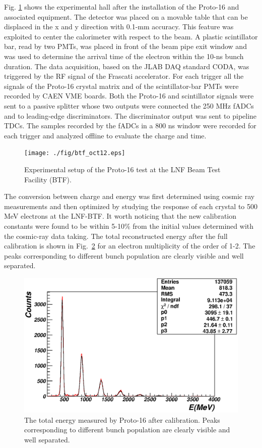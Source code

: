 Fig. \ref{fig:btf} shows the experimental hall after the installation
of the Proto-16 and associated equipment. The detector was placed on a
movable table that can be displaced in the x and y direction with
0.1-mm accuracy. This feature was exploited to center the calorimeter
with respect to the beam. A plastic scintillator bar, read by two
PMTs, was placed in front of the beam pipe exit window and was used to
determine the arrival time of the electron within the 10-ns bunch
duration. The data acquisition, based on the JLAB DAQ standard CODA,
was triggered by the RF signal of the Frascati accelerator. For each
trigger all the signals of the Proto-16 crystal matrix and of the
scintillator-bar PMTs were recorded by CAEN VME boards. Both the
Proto-16 and scintillator signals were sent to a passive splitter
whose two outputs were connected the 250 MHz fADCs and to leading-edge
discriminators. The discriminator output was sent to pipeline
TDCs. The samples recorded by the fADCs in a 800 ns window were recorded for
each trigger and analyzed offline to evaluate the charge and time.

\begin{figure}
\texttt{[image: ./fig/btf\_oct12.eps]}
\caption{Experimental setup of the Proto-16 test at the LNF Beam Test Facility (BTF).}
\label{fig:btf}
\end{figure}

The conversion between charge and energy  was first determined using cosmic ray measurements and  then
optimized  by studying the response of each crystal
to 500 MeV electrons at the LNF-BTF. It worth noticing that the new calibration constants were
found to be within 5-10\% from the initial values determined with the
cosmic-ray data taking.
The total reconstructed energy  after
the full calibration is shown in Fig.~\ref{fig:btf_etot} for an
electron multiplicity of the order of 1-2. The peaks corresponding to
different bunch population are clearly visible and well
separated. 

\begin{figure}
\includegraphics[width=1.0\columnwidth]{./fig/btf_etot_1876_2_6.eps}
\caption{The  total energy measured by Proto-16 after 
  calibration. Peaks corresponding to different
  bunch population are clearly visible and well separated. }
\label{fig:btf_etot}
\end{figure}


